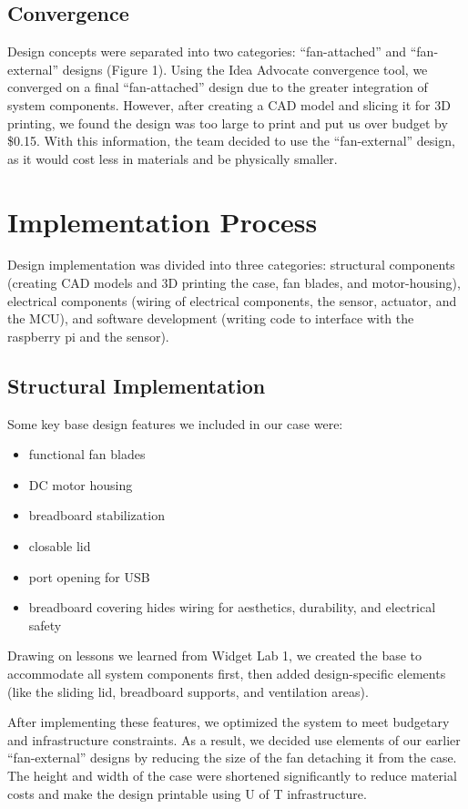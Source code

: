 \documentclass[11pt]{article}
\begin{document}
\subsection{Convergence}
Design concepts were separated into two categories: “fan-attached” and “fan-external” designs (Figure 1). Using the Idea Advocate convergence tool, we converged on a final “fan-attached” design due to the greater integration of system components. However, after creating a CAD model and slicing it for 3D printing, we found the design was too large to print and put us over budget by \$0.15. With this information, the team decided to use the “fan-external” design, as it would cost less in materials and be physically smaller.




\section{Implementation Process}
Design implementation was divided into three categories: structural components (creating CAD models and 3D printing the case, fan blades, and motor-housing), electrical components (wiring of electrical components, the sensor, actuator, and the MCU), and software development (writing code to interface with the raspberry pi and the sensor).

\subsection{Structural Implementation}
Some key base design features we included in our case were:
\begin{itemize}
    \item functional fan blades
    \item DC motor housing
    \item breadboard stabilization
    \item closable lid
    \item port opening for USB
    \item breadboard covering hides wiring for aesthetics, durability, and electrical safety
\end{itemize}
Drawing on lessons we learned from Widget Lab 1, we created the base to accommodate all system components first, then added design-specific elements (like the sliding lid, breadboard supports, and ventilation areas).

After implementing these features, we optimized the system to meet budgetary and infrastructure constraints. As a result, we decided use elements of our earlier “fan-external” designs by reducing the size of the fan detaching it from the case. The height and width of the case were shortened significantly to reduce material costs and make the design printable using U of T infrastructure. 
\end{document}
